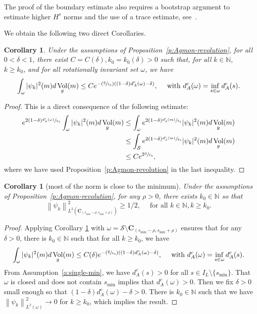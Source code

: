 \documentclass[10pt]{amsart}
\newcommand{\Psfrac}[2]{(\sfrac{#1}{#2})}
\newtheorem{corollary}[lemma]{Corollary}
\theoremstyle{definition}
\newcommand{\calS}{\ensuremath{\mathcal S}}
\newcommand{\mb}[1]{\ensuremath{\mathbb{#1}}}
\newcommand{\N}{{\mb{N}}}
\DeclareMathOperator{\Vol}{Vol}
\newcommand\bnp{\begin{proof}}
\newcommand\enp{\end{proof}}
\newcommand\nor[2]{\left\|#1\right\|_{#2}}
\newcommand{\ce}{c}
\let\e\varepsilon
\newcommand\CO[1]{\boldsymbol{C}_{\!#1}}
\begin{document}
The proof of the boundary estimate also requires a bootstrap argument to estimate higher $H^s$ norms and the use of a trace estimate, see~\cite[Prop.\,3.3.1 \&~3.3.4]{Helffer:booksemiclassic}.

We obtain the following two direct Corollaries.
\begin{corollary}
\label{coragmonfaible}
Under the assumptions of Proposition~\ref{p:Agmon-revolution}, for all $0<\delta< 1$, there exist $C=C(\delta),k_0=k_0(\delta)>0$ such that, for all $k \in \N$, $k \geq k_0$, and for all rotationally invariant set $\omega$, we have
\[
\int_{\omega} |\psi_k|^2(m) d\Vol_g(m)
\leq C e^{-\Psfrac{2}{\e_k} ((1-\delta)d_A^{\ce}(\omega) - \delta) }, \quad \text{ with } d_A^{\ce}(\omega) = \inf_{s\in \omega} d_A^{\ce}(s).
\]
\end{corollary}
\bnp
This is a direct consequence of the following estimate:
\begin{align*}
e^{2(1-\delta)\sfrac{ d_A^{\ce}(\omega)}{\e_k}} \int_{\omega} |\psi_k|^2(m) d\Vol_g(m) & \leq\int_{\omega} e^{2(1-\delta)\sfrac{ d_A^{\ce}(m)}{\e_k}} |\psi_k|^2(m) d\Vol_g(m) \\
& \leq \int_{\calS} e^{2(1-\delta)\sfrac{ d_A^{\ce}(m)}{\e_k}} |\psi_k|^2(m) d\Vol_g(m)\\
&\leq C e^{2\sfrac{\delta}{\e_k}},
\end{align*}
where we have used Proposition~\ref{p:Agmon-revolution} in the last inequality.
\enp
\begin{corollary}[most of the norm is close to the minimum]
\label{corpresx0}
Under the assumptions of Proposition~\ref{p:Agmon-revolution}, for any $\rho>0$, there exists $k_0\in \N$ so that
\[
\nor{\psi_k}{L^2(\CO{(s_{\min}-\rho, s_{\min} +\rho)})}^2\geq 1/2, \quad \text{ for all } k\in \N, k\geq k_0.
\]
\end{corollary}
\bnp
Applying Corollary \ref{coragmonfaible} with $\omega=\mathcal{S}\setminus\CO{(s_{\min}-\rho, s_{\min} +\rho)}$ ensures that for any $\delta>0$, there is $k_0\in \N$ such that for all $k\geq k_0$, we have
\[
\int_{\omega} |\psi_k|^2(m) d\Vol_g(m)
\leq C(\delta) e^{-\Psfrac{2}{\e_k} ((1-\delta)d_A^{\ce}(\omega) - \delta) }, \quad \text{ with } d_A^{\ce}(\omega) = \inf_{s\in \omega} d_A^{\ce}(s).
\]
From Assumption~\ref{a:single-min}, we have $d_A^{\ce}(s)>0$ for all $s \in I_L\setminus \{s_{\min}\}$. That $\omega$ is closed and does not contain $s_{\min}$ implies that $d_A^{\ce}(\omega)>0$.
Then we fix $\delta>0$ small enough so that $(1-\delta)d_A^{\ce}(\omega) - \delta>0$. There is $k_0\in \N$ such that we have $\nor{\psi_k}{L^2(\omega)}^2 \to 0$ for $k \geq k_0$, which implies the result.
\enp
\end{document}
